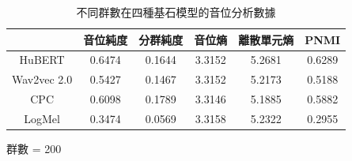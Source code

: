 {\begin{table}[!htbp]
    \vspace{0.5cm}

    \begin{subtable}[t]{\textwidth}
        \centering
        \begin{tabular}{|c|c|c|c|c|c|} \hline
                        & 音位純度   & 分群純度   & 音位熵    & 離散單元熵  & PNMI   \\ \hline
            HuBERT      &     0.6474 &     0.1644 &    3.3152 &      5.2681 & 0.6289 \\ \hline    %
            Wav2vec 2.0 &     0.5427 &     0.1467 &    3.3152 &      5.2173 & 0.5188 \\ \hline    %
            CPC         &     0.6098 &     0.1789 &    3.3146 &      5.1885 & 0.5882 \\ \hline    %
            LogMel      &     0.3474 &     0.0569 &    3.3158 &      5.2322 & 0.2955 \\ \hline    %
        \end{tabular}
        \caption{群數 = 200}
        \label{tab:ch3-clu200-phn}
    \end{subtable}

    \caption{不同群數在四種基石模型的音位分析數據}
    \label{tab:single-cluster-results}
\end{table}

}

